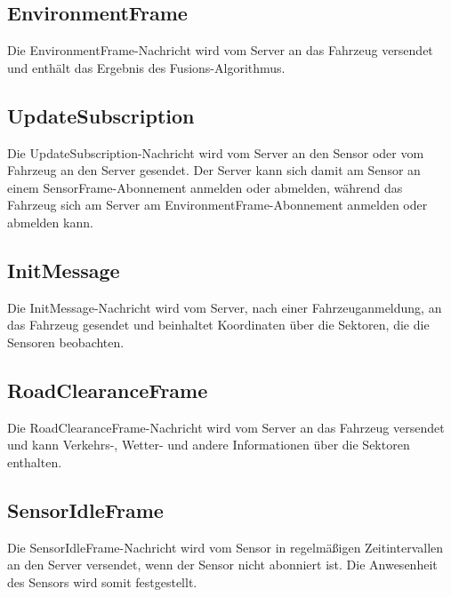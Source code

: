 \subsection{EnvironmentFrame}
\label{msg:environment_frame}

Die EnvironmentFrame-Nachricht wird vom Server an das Fahrzeug versendet und enthält das Ergebnis des Fusions-Algorithmus.

\subsection{UpdateSubscription}
\label{msg:update_subscription}

Die UpdateSubscription-Nachricht wird vom Server an den Sensor oder vom Fahrzeug an den Server gesendet.
Der Server kann sich damit am Sensor an einem SensorFrame-Abonnement anmelden oder abmelden, während das Fahrzeug sich am Server am EnvironmentFrame-Abonnement anmelden oder abmelden kann.

\subsection{InitMessage}
\label{msg:init_message}

Die InitMessage-Nachricht wird vom Server, nach einer Fahrzeuganmeldung, an das Fahrzeug gesendet und beinhaltet Koordinaten über die Sektoren, die die Sensoren beobachten.

\subsection{RoadClearanceFrame}

Die RoadClearanceFrame-Nachricht wird vom Server an das Fahrzeug versendet und kann Verkehrs-, Wetter- und andere Informationen über die Sektoren enthalten.

\subsection{SensorIdleFrame}
\label{msg:sensor_idle_frame}

Die SensorIdleFrame-Nachricht wird vom Sensor in regelmäßigen Zeitintervallen an den Server versendet, wenn der Sensor nicht abonniert ist.
Die Anwesenheit des Sensors wird somit festgestellt.


